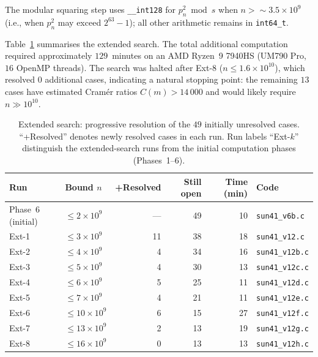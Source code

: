 \documentclass[12pt]{article}
\begin{document}
	The modular squaring step uses \texttt{\_\_int128} for
	$p_n^2 \bmod s$ when $n > \sim 3.5 \times 10^9$ (i.e., when
	$p_n^2$ may exceed $2^{63}-1$); all other arithmetic remains in
	\texttt{int64\_t}.

	Table~\ref{tab:extended} summarises the extended search.
	The total additional computation required approximately $129$~minutes
	on an AMD Ryzen~9 7940HS (UM790 Pro, $16$ OpenMP threads).
	The search was halted after Ext-8 ($n \leq 1.6 \times 10^{10}$),
	which resolved $0$ additional cases, indicating a natural stopping
	point: the remaining $13$ cases have
	estimated Cram\'er ratios $C(m) > 14\,000$ and would likely require
	$n \gg 10^{10}$.

	\begin{table}[ht]
		\centering
		\caption{Extended search: progressive resolution of the $49$ initially
			unresolved cases.  ``+Resolved'' denotes newly resolved cases in
			each run.  Run labels ``Ext-$k$'' distinguish the extended-search
			runs from the initial computation phases (Phases~1--6).}
		\label{tab:extended}
		\small
		\begin{tabular}{llrrrl}
			\toprule
			Run & Bound $n$ & +Resolved & Still open & Time (min) & Code \\
			\midrule
			Phase~6 (initial) & $\leq 2 \times 10^9$  & ---& 49 & 10 & \texttt{sun41\_v6b.c} \\
			Ext-1 & $\leq 3 \times 10^9$  & 11 & 38 & 18 & \texttt{sun41\_v12.c} \\
			Ext-2 & $\leq 4 \times 10^9$  &  4 & 34 & 16 & \texttt{sun41\_v12b.c} \\
			Ext-3 & $\leq 5 \times 10^9$  &  4 & 30 & 13 & \texttt{sun41\_v12c.c} \\
			Ext-4 & $\leq 6 \times 10^9$  &  5 & 25 & 11 & \texttt{sun41\_v12d.c} \\
			Ext-5 & $\leq 7 \times 10^9$  &  4 & 21 & 11 & \texttt{sun41\_v12e.c} \\
			Ext-6 & $\leq 10 \times 10^9$ &  6 & 15 & 27 & \texttt{sun41\_v12f.c} \\
			Ext-7 & $\leq 13 \times 10^9$ &  2 & 13 & 19 & \texttt{sun41\_v12g.c} \\
			Ext-8 & $\leq 16 \times 10^9$ &  0 & 13 & 13 & \texttt{sun41\_v12h.c} \\
			\bottomrule
		\end{tabular}
	\end{table}
\end{document}
